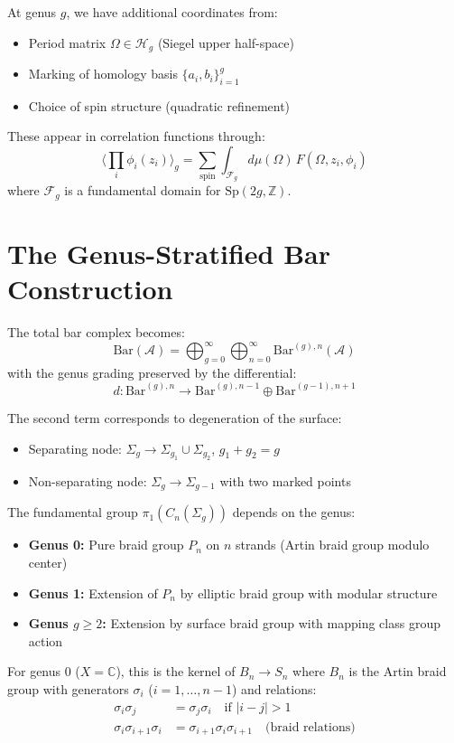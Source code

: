 At genus $g$, we have additional coordinates from:
\begin{itemize}
\item Period matrix $\Omega \in \mathcal{H}_g$ (Siegel upper half-space)
\item Marking of homology basis $\{a_i, b_i\}_{i=1}^g$
\item Choice of spin structure (quadratic refinement)
\end{itemize}

These appear in correlation functions through:
$$\langle \prod_i \phi_i(z_i) \rangle_g = \sum_{\text{spin}} \int_{\mathcal{F}_g} d\mu(\Omega) \, F(\Omega, z_i, \phi_i)$$
where $\mathcal{F}_g$ is a fundamental domain for $\text{Sp}(2g, \mathbb{Z})$.

\section{The Genus-Stratified Bar Construction}

The total bar complex becomes:
$$\text{Bar}(\mathcal{A}) = \bigoplus_{g=0}^{\infty} \bigoplus_{n=0}^{\infty} \text{Bar}^{(g),n}(\mathcal{A})$$
with the genus grading preserved by the differential:
$$d: \text{Bar}^{(g),n} \to \text{Bar}^{(g),n-1} \oplus \text{Bar}^{(g-1),n+1}$$

The second term corresponds to degeneration of the surface:
\begin{itemize}
\item Separating node: $\Sigma_g \to \Sigma_{g_1} \cup \Sigma_{g_2}$, $g_1 + g_2 = g$
\item Non-separating node: $\Sigma_g \to \Sigma_{g-1}$ with two marked points
\end{itemize}

 
\begin{proposition}
The fundamental group $\pi_1(C_n(\Sigma_g))$ depends on the genus:
\begin{itemize}
\item \textbf{Genus 0:} Pure braid group $P_n$ on $n$ strands (Artin braid group modulo center)
\item \textbf{Genus 1:} Extension of $P_n$ by elliptic braid group with modular structure
\item \textbf{Genus $g \geq 2$:} Extension by surface braid group with mapping class group action
\end{itemize}

For genus 0 ($X = \mathbb{C}$), this is the kernel of $B_n \to S_n$ where $B_n$ is the Artin braid group with generators $\sigma_i$ ($i = 1, \ldots, n-1$) and relations:
\begin{align}
\sigma_i\sigma_j &= \sigma_j\sigma_i \quad \text{if } |i-j| > 1 \\
\sigma_i\sigma_{i+1}\sigma_i &= \sigma_{i+1}\sigma_i\sigma_{i+1} \quad \text{(braid relations)}
\end{align}
\end{proposition}
 
